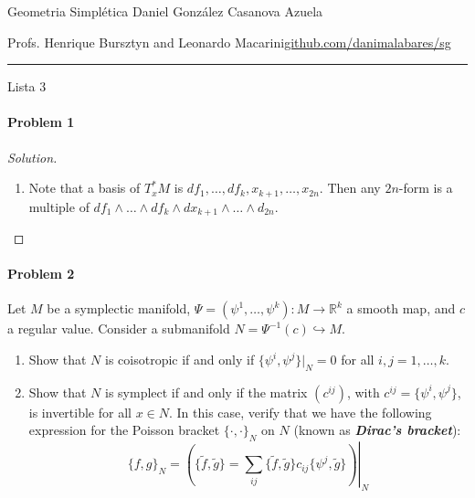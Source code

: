 

%



\begin{minipage}{\textwidth}
	\begin{minipage}{1\textwidth}
		Geometria Simpl\'etica \hfill Daniel González Casanova Azuela
		
		{\small Profs. Henrique Bursztyn and Leonardo Macarini\hfill\href{https://github.com/danimalabares/sg}{github.com/danimalabares/sg}}
	\end{minipage}
\end{minipage}\vspace{.2cm}\hrule

\vspace{10pt}
{\huge Lista 3}

\tableofcontents

\paragraph{Problem 1}

\begin{proof}[Solution]\leavevmode
	\begin{enumerate}[label=\alph*.]
		\item {\color{magenta}Note} that a basis of $T_x^*M$ is $df_1,\ldots,df_k,x_{k+1},\ldots,x_{2n}$. Then any $2n$-form is a multiple of  $df_1\wedge \ldots \wedge df_k\wedge dx_{k+1}\wedge \ldots\wedge d_{2n}$. 
	\end{enumerate}
\end{proof}

\paragraph{Problem 2} Let $M$ be a symplectic manifold, $\Psi=(\psi^1,\ldots,\psi^k):M\to \mathbb{R}^{k}$ a smooth map, and $c$ a regular value. Consider a submanifold $N=\Psi^{-1}(c)\hookrightarrow M$.
\begin{enumerate}[label=\alph*.]
	\item Show that $N$ is coisotropic if and only if $\{\psi^i,\psi^j\}|_{N}=0$ for all $i,j=1,\ldots,k$.
	
	\item Show that $N$ is symplect if and only if the matrix $(c^{ij})$, with $c^{ij}=\{\psi^i,\psi^j\}$, is invertible for all $x\in N$. In this case, verify that we have the following expression for the Poisson bracket $\{\cdot,\cdot\}_N$ on $N$ (known as \textit{\textbf{Dirac's bracket}}):
	\[\{f,g\}_N=\left.\left(\{\tilde{f},\tilde{g}\} =\sum_{ij}\{\tilde{f},\tilde{g}\} c_{ij}\{\psi^j,\tilde{g}\}\right)\right|_{N}\]
\end{enumerate}

